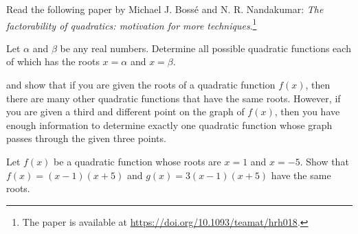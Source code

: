 \documentclass[a4paper,oneside,12pt]{article}
\begin{document}
\begin{problem}
\item Read the following paper by Michael J. Boss\'e and
  N. R. Nandakumar: \emph{The factorability of quadratics: motivation
    for more techniques}.\footnote{
    The paper is available at
    \url{https://doi.org/10.1093/teamat/hrh018}.
  }

\item\label{prob:given_roots_all_possible_quadratics}
  Let $\alpha$ and $\beta$ be any real numbers.  Determine all
  possible quadratic functions each of which has the roots
  $x = \alpha$ and $x = \beta$.

\item{} and
   show that if you
  are given the roots of a quadratic function $f(x)$, then there are
  many other quadratic functions that have the same roots.  However,
  if you are given a third and different point on the graph of $f(x)$,
  then you have enough information to determine exactly one quadratic
  function whose graph passes through the given three points.
  \begin{packedenum}
  \item\label{subprob:given_roots_x1_x5}
    Let $f(x)$ be a quadratic function whose roots are $x = 1$ and
    $x = -5$.  Show that $f(x) = (x - 1) (x + 5)$ and
    $g(x) = 3(x - 1) (x + 5)$ have the same roots.


\end{packedenum}
\end{problem}
\end{document}
